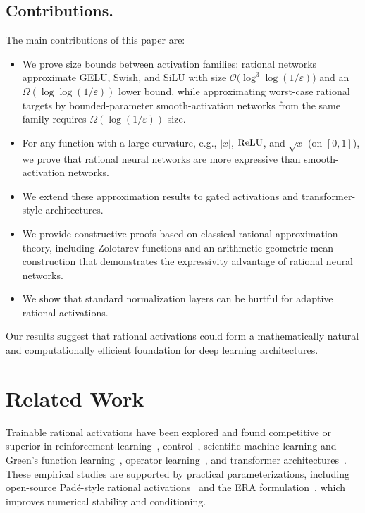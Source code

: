\documentclass{article}
\theoremstyle{plain}
\theoremstyle{definition}
\theoremstyle{remark}
\begin{document}
\subsection*{Contributions.}
The main contributions of this paper are:
\begin{itemize}
\item  {We prove size bounds between activation families: rational networks approximate GELU, Swish, and SiLU with size $\mathcal{O}\bigl(\log^3\!\log(1/\varepsilon)\bigr)$ and an $\Omega(\log\log(1/\varepsilon))$ lower bound, while approximating worst-case rational targets by bounded-parameter smooth-activation networks from the same family requires $\Omega(\log(1/\varepsilon))$ size.}
\item For any function with a large curvature, e.g., $|x|$, ${\rm ReLU}$, and $\sqrt{x}$ (on $[0,1]$), we prove that rational neural networks are more expressive than smooth-activation networks.
\item We extend these approximation results to gated activations and transformer-style architectures.
\item We provide constructive proofs based on classical rational approximation theory, including Zolotarev functions and an arithmetic-geometric-mean construction that demonstrates the expressivity advantage of rational neural networks. 
\item We show that standard normalization layers can be hurtful for adaptive rational activations.
\end{itemize}


Our results suggest that rational activations could form a mathematically natural and computationally efficient foundation for deep learning architectures.  %


\section{\texorpdfstring{ {Related Work}}{Related Work}}
\label{sec:related}

 {Trainable rational activations have been explored and found competitive or superior in reinforcement learning~\cite{delfosse2024adaptive,surdej2025balancingexpressivityrobustnessconstrained}, control~\cite{newton2023rationalcontrollers}, scientific machine learning and Green's function learning~\cite{boulle2022greens}, operator learning~\cite{madala2025mno,wu2025pockan}, and transformer architectures~\cite{fang-etal-2023-transformers}. These empirical studies are supported by practical parameterizations, including open-source Pad\'e-style rational activations~\cite{delfosse2020rationals,delfosse2024adaptive} and the ERA formulation~\cite{trimmel2022era}, which improves numerical stability and conditioning.}
\end{document}
